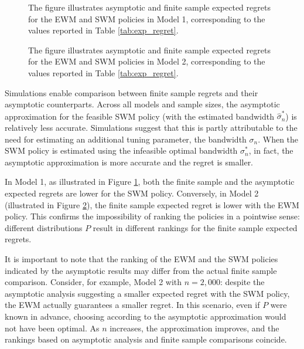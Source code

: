 {\begin{figure}
\begin{center}
\caption{\small The figure illustrates asymptotic and finite sample expected regrets for the EWM and SWM policies in Model 1, corresponding to the values reported in Table \ref{tab:exp_regret}.}
\label{fig:exp_reg_model1}
\end{center}
\end{figure}

\begin{figure}
\begin{center}
\caption{\small The figure illustrates asymptotic and finite sample expected regrets for the EWM and SWM policies in Model 2, corresponding to the values reported in Table \ref{tab:exp_regret}.}
\label{fig:exp_reg_model2}
\end{center}
\end{figure}

Simulations enable comparison between finite sample regrets and their asymptotic counterparts. Across all models and sample sizes, the asymptotic approximation for the feasible SWM policy (with the estimated bandwidth $\hat{\sigma}_n^*$) is relatively less accurate. Simulations suggest that this is partly attributable to the need for estimating an additional tuning parameter, the bandwidth $\sigma_n$. When the SWM policy is estimated using the infeasible optimal bandwidth $\sigma^*_n$, in fact, the asymptotic approximation is more accurate and the regret is smaller.

In Model 1, as illustrated in Figure \ref{fig:exp_reg_model1}, both the finite sample and the asymptotic expected regrets are lower for the SWM policy. Conversely, in Model 2 (illustrated in Figure \ref{fig:exp_reg_model2}), the finite sample expected regret is lower with the EWM policy. This confirms the impossibility of ranking the policies in a pointwise sense: different distributions $P$ result in different rankings for the finite sample expected regrets.

It is important to note that the ranking of the EWM and the SWM policies indicated by the asymptotic results may differ from the actual finite sample comparison. Consider, for example, Model 2 with $n=2,000$: despite the asymptotic analysis suggesting a smaller expected regret with the SWM policy, the EWM actually guarantees a smaller regret. In this scenario, even if $P$ were known in advance, choosing according to the asymptotic approximation would not have been optimal. As $n$ increases, the approximation improves, and the rankings based on asymptotic analysis and finite sample comparisons coincide.

}

